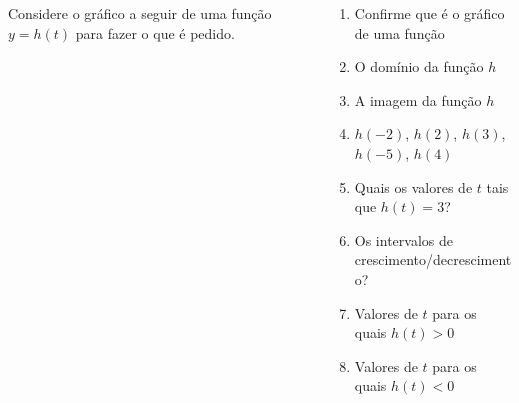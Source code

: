 \begin{frame}
  \begin{columns}[onlytextwidth]
    \begin{column}{0.49\textwidth}
      \begin{example}
        Considere o gráfico a seguir de uma função $y=h(t)$ para fazer o que é pedido.
      \end{example}
      \vspace*{-0.45cm}
      \begin{figure}
      \end{figure}
    \end{column}

    \begin{column}{0.49\textwidth}
      \begin{highlight}
        \begin{enumerate}
          \item Confirme que é o gráfico de uma função
          \item O domínio da função $h$
          \item A imagem da função $h$
          \item $h(-2)$, $h(2)$, $h(3)$, $h(-5)$, $h(4)$
          \item Quais os valores de $t$ tais que $h(t) = 3$?
          \item Os intervalos de crescimento/decrescimento?
          \item Valores de $t$ para os quais $h(t)>0$
          \item Valores de $t$ para os quais $h(t)<0$
        \end{enumerate}
      \end{highlight}
    \end{column}
  \end{columns}
\end{frame}

